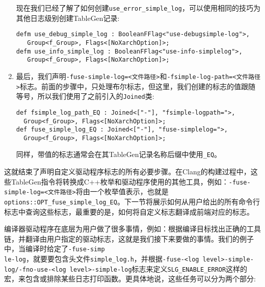 \begin{enumerate}
现在我们已经了解了如何创建\texttt{use\_error\_simple\_log}，可以使用相同的技巧为其他日志级别创建TableGen记录:

\begin{lstlisting}[style=styleJavaScript]
defm use_debug_simple_log : BooleanFFlag<"use-debugsimple-log">, 
   Group<f_Group>, Flags<[NoXarchOption]>;
defm use_info_simple_log : BooleanFFlag<"use-info-simplelog">, 
   Group<f_Group>, Flags<[NoXarchOption]>;
\end{lstlisting}

\item 最后，我们声明\texttt{-fuse-simple-log=<文件路径>}和\texttt{-fsimple-log-path=<文件路径>}标志。前面的步骤中，只处理布尔标志，但这里，我们创建的标志的值跟随等号，所以我们使用了之前引入的\texttt{Joined}类:

\begin{lstlisting}[style=styleJavaScript]
def fsimple_log_path_EQ : Joined<["-"], "fsimple-logpath=">, 
  Group<f_Group>, Flags<[NoXarchOption]>;
def fuse_simple_log_EQ : Joined<["-"], "fuse-simplelog=">, 
  Group<f_Group>, Flags<[NoXarchOption]>;
\end{lstlisting}

同样，带值的标志通常会在其TableGen记录名称后缀中使用\texttt{\_EQ}。

\end{enumerate}

这就结束了声明自定义驱动程序标志的所有必要步骤。在Clang的构建过程中，这些TableGen指令将转换成C++枚举和驱动程序使用的其他工具，例如：\texttt{-fuse-simple-log=<文件路径>}将由一个枚举值表示，也就是\texttt{options::OPT\_fuse\_simple\_log\_EQ}。下一节将展示如何从用户给出的所有命令行标志中查询这些标志，最重要的是，如何将自定义标志翻译成前端对应的标志。


编译器驱动程序在底层为用户做了很多事情，例如：根据编译目标找出正确的工具链，并翻译由用户指定的驱动标志，这就是我们接下来要做的事情。我们的例子中，当编译时给定了\texttt{-fuse-simp\\le-log}，就要要包含头文件\texttt{simple\_log.h}，并根据\texttt{-fuse-<log level>-simple-log/-fno-use-<log level>-simple-log}标志来定义\texttt{SLG\_ENABLE\_ERROR}这样的宏，来包含或排除某些日志打印函数。更具体地说，这些任务可以分为两个部分:


